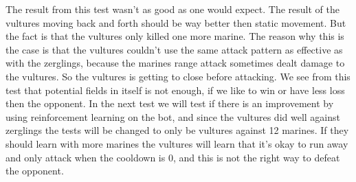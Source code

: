 The result from this test wasn't as good as one would expect. The result of the vultures moving back and forth should be way better then static movement. But the fact is that the vultures only killed one more marine. The reason why this is the case is that the vultures couldn't use the same attack pattern as effective as with the zerglings, because the marines range attack sometimes dealt damage to the vultures. So the vultures is getting to close before attacking.
We see from this test that potential fields in itself is not enough, if we like to win or have less loss then the opponent. In the next test we will test if there is an improvement by using reinforcement learning on the bot, and since the vultures did well against zerglings the tests will be changed to only be vultures against 12 marines. If they should learn with more marines the vultures will learn that it's okay to run away and only attack when the cooldown is 0, and this is not the right way to defeat the opponent.




